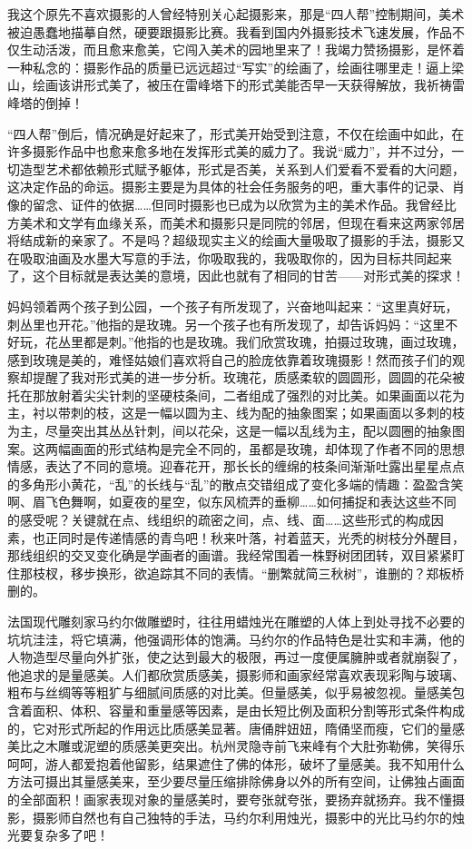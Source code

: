\documentclass{article}
\begin{document}
我这个原先不喜欢摄影的人曾经特别关心起摄影来，那是“四人帮”控制期间，美术被迫愚蠢地描摹自然，硬要跟摄影比赛。我看到国内外摄影技术飞速发展，作品不仅生动活泼，而且愈来愈美，它闯入美术的园地里来了！我竭力赞扬摄影，是怀着一种私念的：摄影作品的质量已远远超过“写实”的绘画了，绘画往哪里走！逼上梁山，绘画该讲形式美了，被压在雷峰塔下的形式美能否早一天获得解放，我祈祷雷峰塔的倒掉！

“四人帮”倒后，情况确是好起来了，形式美开始受到注意，不仅在绘画中如此，在许多摄影作品中也愈来愈多地在发挥形式美的威力了。我说“威力”，并不过分，一切造型艺术都依赖形式赋予躯体，形式是否美，关系到人们爱看不爱看的大问题，这决定作品的命运。摄影主要是为具体的社会任务服务的吧，重大事件的记录、肖像的留念、证件的依据……但同时摄影也已成为以欣赏为主的美术作品。我曾经比方美术和文学有血缘关系，而美术和摄影只是同院的邻居，但现在看来这两家邻居将结成新的亲家了。不是吗？超级现实主义的绘画大量吸取了摄影的手法，摄影又在吸取油画及水墨大写意的手法，你吸取我的，我吸取你的，因为目标共同起来了，这个目标就是表达美的意境，因此也就有了相同的甘苦——对形式美的探求！

妈妈领着两个孩子到公园，一个孩子有所发现了，兴奋地叫起来：“这里真好玩，刺丛里也开花。”他指的是玫瑰。另一个孩子也有所发现了，却告诉妈妈：“这里不好玩，花丛里都是刺。”他指的也是玫瑰。我们欣赏玫瑰，拍摄过玫瑰，画过玫瑰，感到玫瑰是美的，难怪姑娘们喜欢将自己的脸庞依靠着玫瑰摄影！然而孩子们的观察却提醒了我对形式美的进一步分析。玫瑰花，质感柔软的圆圆形，圆圆的花朵被托在那放射着尖尖针刺的坚硬枝条间，二者组成了强烈的对比美。如果画面以花为主，衬以带刺的枝，这是一幅以圆为主、线为配的抽象图案；如果画面以多刺的枝为主，尽量突出其丛丛针刺，间以花朵，这是一幅以乱线为主，配以圆圈的抽象图案。这两幅画面的形式结构是完全不同的，虽都是玫瑰，却体现了作者不同的思想情感，表达了不同的意境。迎春花开，那长长的缠绵的枝条间渐渐吐露出星星点点的多角形小黄花，“乱”的长线与“乱”的散点交错组成了变化多端的情趣：盈盈含笑啊、眉飞色舞啊，如夏夜的星空，似东风梳弄的垂柳……如何捕捉和表达这些不同的感受呢？关键就在点、线组织的疏密之间，点、线、面……这些形式的构成因素，也正同时是传递情感的青鸟吧！秋来叶落，衬着蓝天，光秃的树枝分外醒目，那线组织的交叉变化确是学画者的画谱。我经常围着一株野树团团转，双目紧紧盯住那枝杈，移步换形，欲追踪其不同的表情。“删繁就简三秋树”，谁删的？郑板桥删的。

法国现代雕刻家马约尔做雕塑时，往往用蜡烛光在雕塑的人体上到处寻找不必要的坑坑洼洼，将它填满，他强调形体的饱满。马约尔的作品特色是壮实和丰满，他的人物造型尽量向外扩张，使之达到最大的极限，再过一度便属臃肿或者就崩裂了，他追求的是量感美。人们都欣赏质感美，摄影师和画家经常喜欢表现彩陶与玻璃、粗布与丝绸等等粗犷与细腻间质感的对比美。但量感美，似乎易被忽视。量感美包含着面积、体积、容量和重量感等因素，是由长短比例及面积分割等形式条件构成的，它对形式所起的作用远比质感美显著。唐俑胖妞妞，隋俑坚而瘦，它们的量感美比之木雕或泥塑的质感美更突出。杭州灵隐寺前飞来峰有个大肚弥勒佛，笑得乐呵呵，游人都爱抱着他留影，结果遮住了佛的体形，破坏了量感美。我不知用什么方法可摄出其量感美来，至少要尽量压缩排除佛身以外的所有空间，让佛独占画面的全部面积！画家表现对象的量感美时，要夸张就夸张，要扬弃就扬弃。我不懂摄影，摄影师自然也有自己独特的手法，马约尔利用烛光，摄影中的光比马约尔的烛光要复杂多了吧！
\end{document}
